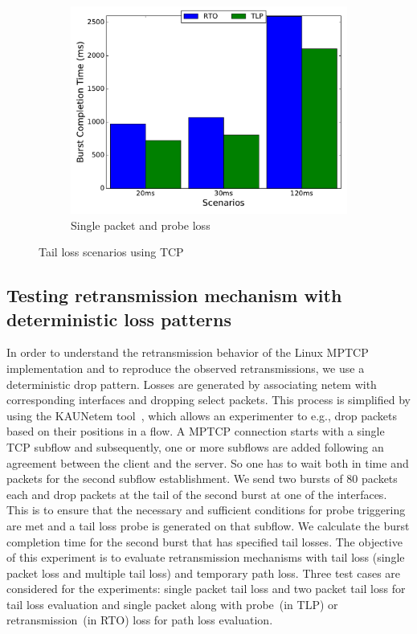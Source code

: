 \documentclass[10pt,conference]{IEEEtran}
\begin{document}
\begin{figure}
\begin{subfigure}{0.32\textwidth}
	\includegraphics[angle=0, width=\textwidth, natwidth=578.16,natheight=433.62]{plots/T1PP.pdf}
	\caption{Single packet and probe loss }\label{t1pp}
 \end{subfigure}
 \caption{Tail loss scenarios using TCP}\label{tcpf}
\end{figure}

\subsection{Testing retransmission mechanism with deterministic loss patterns}
In order to understand the retransmission behavior of the Linux MPTCP implementation and to reproduce the observed retransmissions, we use a 
deterministic drop pattern. Losses are generated by associating netem with corresponding interfaces and dropping select packets. This process 
is simplified by using the KAUNetem tool~\cite{Garcia2016}, which allows an experimenter to e.g., drop packets based on their positions in a flow. 
A MPTCP connection starts with a single TCP subflow and subsequently, one or more subflows are added following an agreement between the client 
and the server. So one has to wait both in time and packets for the second subflow establishment. We send two bursts of 80 packets each and drop 
packets at the tail of the second burst at one of the interfaces. This is to ensure that the necessary and sufficient conditions for probe triggering 
are met and a tail loss probe is generated on that subflow. We calculate the burst completion time for the second burst that has specified tail 
losses. The objective of this experiment is to evaluate retransmission mechanisms with tail loss (single packet loss and multiple tail loss) and 
temporary path loss. Three test cases are considered for the experiments: single packet tail loss and two packet tail loss for tail loss evaluation 
and single packet along with probe~(in TLP) or retransmission~(in RTO) loss for path loss evaluation. 
\end{document}
